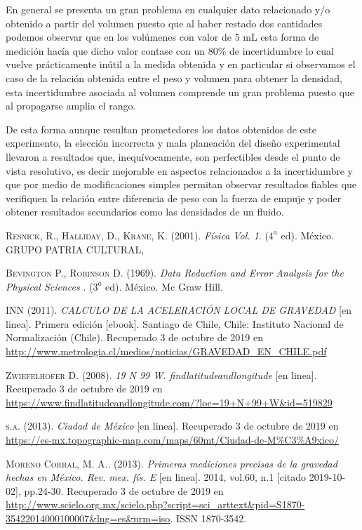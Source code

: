 \documentclass[a4paper]{article}
\begin{document}
En general se presenta un gran problema en cualquier dato relacionado y/o obtenido a partir del volumen puesto que al haber restado dos cantidades podemos observar que en los volúmenes con valor de 5 mL esta forma de medición hacía que dicho valor contase con un 80\% de incertidumbre lo cual vuelve prácticamente inútil a la medida obtenida y en particular si observamos el caso de la relación obtenida entre el peso y volumen para obtener la densidad, esta incertidumbre asociada al volumen comprende un gran problema puesto que al propagarse amplia el rango.

De esta forma aunque resultan prometedores los datos obtenidos de este experimento, la elección incorrecta y mala planeación del diseño experimental llevaron a resultados que, inequívocamente, son perfectibles desde el punto de vista resolutivo, es decir mejorable en aspectos relacionados a la incertidumbre y que por medio de modificaciones simples permitan observar resultados fiables que verifiquen la relación entre diferencia de peso con la fuerza de empuje y poder obtener resultados secundarios como las densidades de un fluido.













\begin{thebibliography}{a}
 \textsc{Resnick, R., Halliday, D., Krane, K.} (2001). \textit{Física Vol. 1}. ($4^a$ ed). México. GRUPO PATRIA CULTURAL,

 \textsc{Bevington P., Robinson D.} (1969). \textit{Data Reduction and Error Analysis for the Physical Sciences
}. ($3^a$ ed). México. Mc Graw Hill.

 \textsc{INN} (2011). \textit{CALCULO DE LA ACELERACIÓN LOCAL DE GRAVEDAD} [en linea]. Primera edición [ebook]. Santiago de Chile, Chile: Instituto Nacional de Normalización (Chile). Recuperado 3 de octubre de 2019 en \url{http://www.metrologia.cl/medios/noticias/GRAVEDAD_EN_CHILE.pdf}

 \textsc{Zwiefelhofer D.} (2008).
\textit{19 N 99 W. findlatitudeandlongitude} [en linea]. Recuperado 3 de octubre de 2019 en \url{https://www.findlatitudeandlongitude.com/?loc=19+N+99+W&id=519829}

 \textsc{s.a.} (2013).
\textit{Ciudad de México} [en linea]. Recuperado 3 de octubre de 2019 en \url{https://es-mx.topographic-map.com/maps/60mt/Ciudad-de-M\%C3\%A9xico/ }

 \textsc{Moreno Corral, M. A..} (2013).
\textit{Primeras mediciones precisas de la gravedad hechas en México. Rev. mex. fís. E} [en linea].  2014, vol.60, n.1 [citado  2019-10-02], pp.24-30. Recuperado 3 de octubre de 2019 en \url{http://www.scielo.org.mx/scielo.php?script=sci_arttext&pid=S1870-35422014000100007&lng=es&nrm=iso}. ISSN 1870-3542.

\end{thebibliography}
\end{document}
